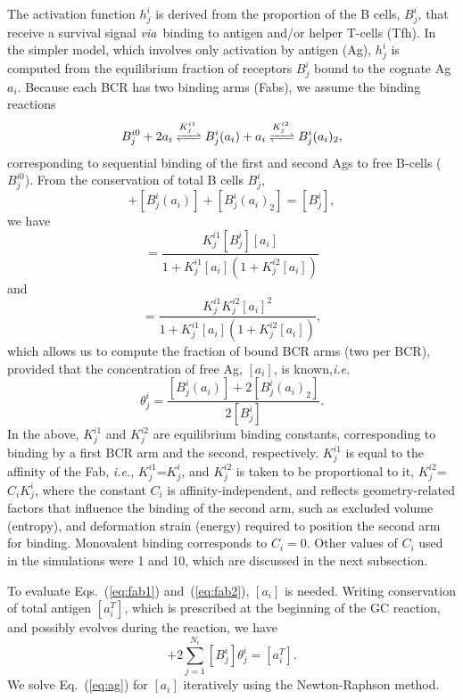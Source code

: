\documentclass[utf8]{frontiersHLTH}%
\newcommand{\vo}[1]{#1} %
\newcommand{\comment}[1]{} %
\def\ie {{\it i.e.}}
\def\via {{\it via}}
\newcommand{\eq}[1] {Eq.~(\ref{eq:#1})}
\newcommand{\eqs}[2]{Eqs.~(\ref{eq:#1}) and~(\ref{eq:#2})}
\begin{document}
The activation function $h^i_j$ is derived from the proportion of the B
cells, $B^i_j$, that receive a survival signal \via~binding to antigen
and/or helper T-cells (Tfh). In the simpler model, which involves only
activation by antigen (Ag), $h^i_j$ is computed from the equilibrium fraction of
receptors $B^i_j$ bound to the cognate Ag $a_i$. Because each BCR has two binding arms (Fabs),
we assume the binding reactions
\begin{equation}
 \ce{$B^{i0}_j + 2a_i$ <=>[$K^{i1}_j$] $B^i_j(a_i) + a_i$ <=>[$K^{i2}_j$] $B^i_j(a_i)_2$ },
 \label{eq:binding}
\end{equation}
corresponding to sequential binding of the first and second Ags to free B-cells ($B^{i0}_j$).
From the conservation of total B cells $B^i_j$,
\begin{equation}
 [B^{i0}_j] + [B^i_j(a_i)] + [B^i_j(a_i)_2] = [B^i_j],
\end{equation}
we have
\begin{equation}
 [B^i_j(a_i)] = \frac{K^{i1}_j[B^i_j][a_i]}{1+K^{i1}_j [a_i](1+K^{i2}_j[a_i])}
 \label{eq:fab1}
\end{equation}
and
\begin{equation}
 [B^i_j(a_i)_2] = \frac{K^{i1}_jK^{i2}_j[a_i]^2}{1+K^{i1}_j [a_i](1+K^{i2}_j[a_i])},
 \label{eq:fab2}
\end{equation}
which allows us to compute the fraction of bound BCR arms (two per BCR), provided that the concentration of free Ag, $[a_i]$, 
is known,\ie
\begin{equation}
 \theta^i_j= \frac{ [B^i_j(a_i)] + 2[B^i_j(a_i)_2]}{2[B^i_j]}.
 \label{eq:theta}
\end{equation}
In the above, $K^{i1}_j$ and $K^{i2}_j$ are equilibrium binding constants, corresponding to binding by
\vo{a}\comment{use ``a'' because it could be either of two} first BCR arm and the second, respectively. $K^{i1}_j$ is equal to the affinity of the Fab, 
\ie, $K^{i1}_j$=$K^i_j$,
and $K^{i2}_j$ is taken to be proportional to it, $K^{i2}_j$=$C_i K^i_j$, where the constant $C_i$ is affinity-independent,
and reflects geometry-related factors that influence the binding of the second arm, such as excluded volume (entropy), and
deformation strain (energy) required to position the second arm for binding. Monovalent binding corresponds to $C_i=0$.
Other values of $C_i$ used in the simulations were 1 and 10, which are discussed in the next subsection.

To evaluate \eqs{fab1}{fab2}, $[a_i]$ is needed. Writing
conservation of total antigen $[a_i^T]$, which is prescribed at the
beginning of the GC reaction, and possibly evolves during the reaction,
we have
\begin{equation}
 [a_i] + 2\sum^{N_\epsilon}_{j=1} [B^i_j]\theta^i_j=[a^T_i].
 \label{eq:ag}
\end{equation}
We solve \eq{ag} for $[a_i]$ iteratively using the Newton-Raphson method.\cite{numrec}
\end{document}
